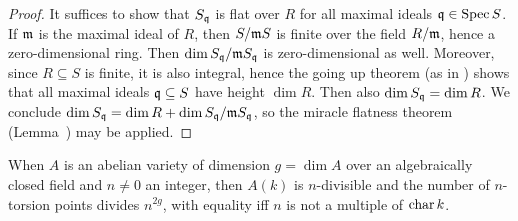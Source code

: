 \documentclass[a4paper,parskip=half,numbers=enddot, DIV=12]{scrreprt}
\begin{document}
\begin{proof}
	It suffices to show that $S_{\mathfrak{q}}$ is flat over $R$ for all maximal ideals $\mathfrak{q}\in\operatorname{Spec} S$. If $\mathfrak{m}$ is the maximal ideal of $R$, then $S/\mathfrak{m} S$ is finite over the field $R/\mathfrak{m}$, hence a zero-dimensional ring. Then $\dim S_{\mathfrak{q}}/\mathfrak{m} S_{\mathfrak{q}}$ is zero-dimensional as well. Moreover, since $R\subseteq S$ is finite, it is also integral, hence the going up theorem (as in \cite[Theorem~7]{alg1}) shows that all maximal ideals $\mathfrak{q}\subseteq S$ have height $\dim R$. Then also $\dim S_{\mathfrak{q}}=\dim R$. We conclude $\dim S_{\mathfrak{q}}=\dim R+\dim S_{\mathfrak{q}}/\mathfrak{m} S_{\mathfrak{q}}$, so the miracle flatness theorem (Lemma~) may be applied.
\end{proof}
\begin{cor}
	When $A$ is an abelian variety of dimension $g=\dim A$ over an algebraically closed field and $n\neq 0$ an integer, then $A(k)$ is $n$-divisible and the number of $n$-torsion points divides $n^{2g}$, with equality iff $n$ is not a multiple of $\operatorname{char} k$.
\end{cor}
\end{document}
